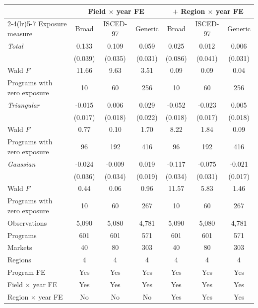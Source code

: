 \begin{tabular}{lcccccc}
\toprule
 & \multicolumn{3}{c}{Field \(\times\) year FE} & \multicolumn{3}{c}{\(+\) Region \(\times\) year FE} \\
\cmidrule(lr){2-4}\cmidrule(lr){5-7}
Exposure measure & Broad & ISCED-97 & Generic & Broad & ISCED-97 & Generic \\
\midrule
\textit{Total} &  0.133\sym{***} &  0.109\sym{***} &  0.059\sym{*} &  0.025 &  0.012 &  0.006 \\
 & (0.039) & (0.035) & (0.031) & (0.086) & (0.041) & (0.031) \\
\quad Wald \(F\) & 11.66 &  9.63 &  3.51 &  0.09 &  0.09 &  0.04 \\
\quad Programs with zero exposure &        10 &        60 &       256 &        10 &        60 &       256 \\
\addlinespace
\textit{Triangular} & -0.015 &  0.006 &  0.029 & -0.052\sym{***} & -0.023 &  0.005 \\
 & (0.017) & (0.018) & (0.022) & (0.018) & (0.017) & (0.018) \\
\quad Wald \(F\) &  0.77 &  0.10 &  1.70 &  8.22 &  1.84 &  0.09 \\
\quad Programs with zero exposure &        96 &       192 &       416 &        96 &       192 &       416 \\
\addlinespace
\textit{Gaussian} & -0.024 & -0.009 &  0.019 & -0.117\sym{***} & -0.075\sym{**} & -0.021 \\
 & (0.036) & (0.034) & (0.019) & (0.034) & (0.031) & (0.017) \\
\quad Wald \(F\) &  0.44 &  0.06 &  0.96 & 11.57 &  5.83 &  1.46 \\
\quad Programs with zero exposure &        10 &        60 &       267 &        10 &        60 &       267 \\
\midrule
Observations &     5,090 &     5,080 &     4,781 &     5,090 &     5,080 &     4,781 \\
Programs &       601 &       601 &       571 &       601 &       601 &       571 \\
Markets &        40 &        80 &       303 &        40 &        80 &       303 \\
Regions &         4 &         4 &         4 &         4 &         4 &         4 \\
Program FE & Yes & Yes & Yes & Yes & Yes & Yes \\
Field \(\times\) year FE & Yes & Yes & Yes & Yes & Yes & Yes \\
Region \(\times\) year FE & No & No & No & Yes & Yes & Yes \\
\bottomrule
\end{tabular}
